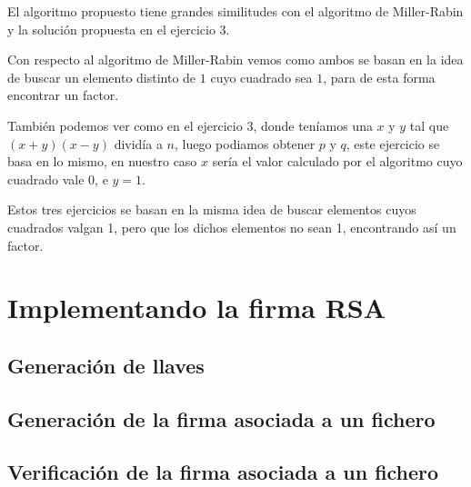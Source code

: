 \documentclass[12pt, spanish]{article}
\begin{document}
El algoritmo propuesto tiene grandes similitudes con el algoritmo de Miller-Rabin y la solución propuesta en el ejercicio 3.

Con respecto al algoritmo de Miller-Rabin vemos como ambos se basan en la idea de buscar un elemento distinto de $1$ cuyo cuadrado sea $1$, para de esta forma encontrar un factor.

También podemos ver como en el ejercicio 3, donde teníamos una $x$ y $y$  tal que $(x + y)(x - y)$ dividía a $n$, luego podiamos obtener $p$ y $q$, este ejercicio se basa en lo mismo, en nuestro caso $x$ sería el valor calculado por el algoritmo cuyo cuadrado vale 0, e $y = 1$.

Estos tres ejercicios se basan en la misma idea de buscar elementos cuyos cuadrados valgan 1, pero que los dichos elementos no sean 1, encontrando así un factor.


\section{Implementando la firma RSA}

\subsection{Generación de llaves}

\subsection{Generación de la firma asociada a un fichero}

\subsection{Verificación de la firma asociada a un fichero}
\end{document}
